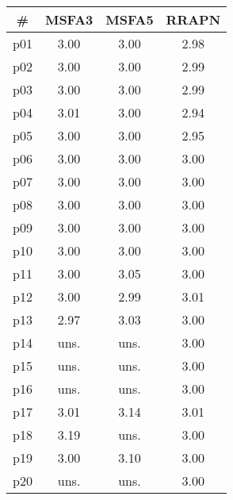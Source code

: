\begin{tabular}{c||c|c|c}
\textbf{\#} & \textbf{MSFA3} & \textbf{MSFA5} & \textbf{RRAPN}\\
\hline
\hline
p01 & 3.00 & 3.00 & 2.98\\
p02 & 3.00 & 3.00 & 2.99\\
p03 & 3.00 & 3.00 & 2.99\\
p04 & 3.01 & 3.00 & 2.94\\
p05 & 3.00 & 3.00 & 2.95\\
p06 & 3.00 & 3.00 & 3.00\\
p07 & 3.00 & 3.00 & 3.00\\
p08 & 3.00 & 3.00 & 3.00\\
p09 & 3.00 & 3.00 & 3.00\\
p10 & 3.00 & 3.00 & 3.00\\
p11 & 3.00 & 3.05 & 3.00\\
p12 & 3.00 & 2.99 & 3.01\\
p13 & 2.97 & 3.03 & 3.00\\
p14 & uns. & uns. & 3.00\\
p15 & uns. & uns. & 3.00\\
p16 & uns. & uns. & 3.00\\
p17 & 3.01 & 3.14 & 3.01\\
p18 & 3.19 & uns. & 3.00\\
p19 & 3.00 & 3.10 & 3.00\\
p20 & uns. & uns. & 3.00\\
\end{tabular}


